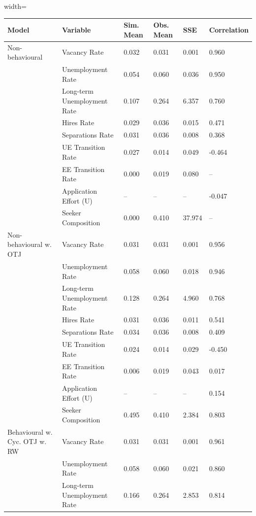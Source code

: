 \begin{table}[ht]
\centering
\begin{adjustbox}{width=\textwidth}
\begin{tabular}{llllll}
\toprule
Model & Variable & Sim. Mean & Obs. Mean & SSE & Correlation \\
\midrule
Non-behavioural & Vacancy Rate & 0.032 & 0.031 & \cellcolor{yellow!25}0.001 & \cellcolor{yellow!25}0.960 \\
 & Unemployment Rate & 0.054 & 0.060 & 0.036 & \cellcolor{black!30}0.950 \\
 & Long-term Unemployment Rate & 0.107 & 0.264 & 6.357 & 0.760 \\
 & Hires Rate & 0.029 & 0.036 & 0.015 & 0.471 \\
 & Separations Rate & 0.031 & 0.036 & 0.008 & 0.368 \\
 & UE Transition Rate & 0.027 & 0.014 & 0.049 & -0.464 \\
 & EE Transition Rate & 0.000 & 0.019 & 0.080 & -- \\
 & Application Effort (U) & -- & -- & -- & -0.047 \\
 & Seeker Composition & 0.000 & 0.410 & 37.974 & -- \\
Non-behavioural w. OTJ & Vacancy Rate & 0.031 & 0.031 & \cellcolor{yellow!25}0.001 & \cellcolor{yellow!25}0.956 \\
 & Unemployment Rate & 0.058 & 0.060 & 0.018 & \cellcolor{black!30}0.946 \\
 & Long-term Unemployment Rate & 0.128 & 0.264 & 4.960 & 0.768 \\
 & Hires Rate & 0.031 & 0.036 & 0.011 & 0.541 \\
 & Separations Rate & 0.034 & 0.036 & 0.008 & 0.409 \\
 & UE Transition Rate & 0.024 & 0.014 & 0.029 & -0.450 \\
 & EE Transition Rate & 0.006 & 0.019 & 0.043 & 0.017 \\
 & Application Effort (U) & -- & -- & -- & 0.154 \\
 & Seeker Composition & 0.495 & 0.410 & 2.384 & \cellcolor{yellow!25}0.803 \\
Behavioural w. Cyc. OTJ w. RW & Vacancy Rate & 0.031 & 0.031 & \cellcolor{yellow!25}0.001 & \cellcolor{yellow!25}0.961 \\
 & Unemployment Rate & 0.058 & 0.060 & 0.021 & 0.860 \\
 & Long-term Unemployment Rate & 0.166 & 0.264 & \cellcolor{yellow!25}2.853 & \cellcolor{yellow!25}0.814 \\

\end{tabular}
\end{adjustbox}
\end{table}
